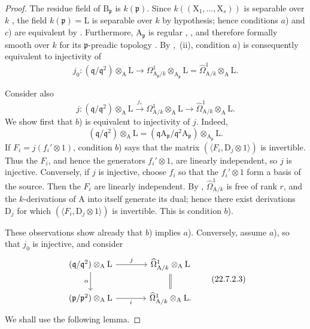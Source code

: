 \begin{proof}
The residue field of $\mathrm{B}_\mathfrak{p}$ is $k(\mathfrak{p})$.
Since $k((\mathrm{X}_1,\ldots,\mathrm{X}_s))$ is separable over $k$ , the field $k(\mathfrak{p})=\mathrm{L}$ is separable over $k$ by hypothesis; hence conditions $a$) and $c$) are equivalent by .
Furthermore, $\mathrm{A}_\mathfrak{p}$ is regular , , and therefore formally smooth over $k$ for its $\mathfrak{p}$-preadic topology .
By ,~(ii), condition $a$) is consequently equivalent to injectivity of
\begin{equation}
\label{0.22.7.2.1}
  j_0:(\mathfrak{q}/\mathfrak{q}^2)\otimes_\mathrm{A}\mathrm{L}
  \longrightarrow \Omega^1_{\mathrm{A}_\mathfrak{p}/k}\otimes_{\mathrm{A}_\mathfrak{p}}\mathrm{L}
  =\widehat{\Omega}^1_{\mathrm{A}/k}\otimes_\mathrm{A}\mathrm{L}.
  \tag{22.7.2.1}
\end{equation}

Consider also
\begin{equation}
\label{0.22.7.2.2}
  j:(\mathfrak{q}/\mathfrak{q}^2)\otimes_\mathrm{A}\mathrm{L}
  \xrightarrow{j_*}\Omega^1_{\mathrm{A}/k}\otimes_\mathrm{A}\mathrm{L}
  \longrightarrow\widehat{\Omega}^1_{\mathrm{A}/k}\otimes_\mathrm{A}\mathrm{L}.
  \tag{22.7.2.2}
\end{equation}
We show first that $b$) is equivalent to injectivity of $j$.
Indeed,
\[
  (\mathfrak{q}/\mathfrak{q}^2)\otimes_\mathrm{A}\mathrm{L}
  =(\mathfrak{q}\mathrm{A}_\mathfrak{p}/\mathfrak{q}^2\mathrm{A}_\mathfrak{p})\otimes_{\mathrm{A}_\mathfrak{p}}\mathrm{L}.
\]
If $F_i=j(f_i'\otimes 1)$, condition $b$) says that the matrix $(\langle F_i,\mathrm{D}_j\otimes 1\rangle)$ is invertible.
Thus the $F_i$, and hence the generators $f_i'\otimes 1$, are linearly independent, so $j$ is injective.
Conversely, if $j$ is injective, choose $f_i$ so that the $f_i'\otimes 1$ form a basis of the source.
Then the $F_i$ are linearly independent.
By , $\widehat{\Omega}^1_{\mathrm{A}/k}$ is free of rank $r$, and the $k$-derivations of $\mathrm{A}$ into itself generate its dual; hence there exist derivations $\mathrm{D}_j$ for which $(\langle F_i,\mathrm{D}_j\otimes 1\rangle)$ is invertible.
This is condition $b$).

These observations show already that $b$) implies $a$).
Conversely, assume $a$), so that $j_0$ is injective, and consider
\begin{equation}
\label{0.22.7.2.3}
\begin{tikzcd}[column sep=large]
  (\mathfrak{q}/\mathfrak{q}^2)\otimes_\mathrm{A}\mathrm{L} \ar[r,"j"] \ar[d,"\alpha"'] & \widehat{\Omega}^1_{\mathrm{A}/k}\otimes_\mathrm{A}\mathrm{L} \ar[d,equal] \\
  (\mathfrak{p}/\mathfrak{p}^2)\otimes_\mathrm{A}\mathrm{L} \ar[r,"i"'] & \widehat{\Omega}^1_{\mathrm{A}/k}\otimes_\mathrm{A}\mathrm{L}.
\end{tikzcd}
\tag{22.7.2.3}
\end{equation}
We shall use the following lemma.
\end{proof}

